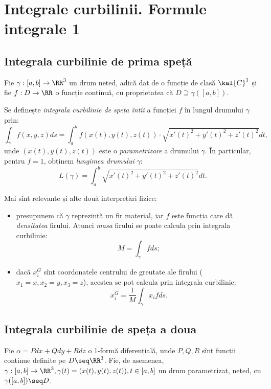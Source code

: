 \chapter{Integrale curbilinii. Formule integrale 1}

\section{Integrala curbilinie de prima speță}

Fie $ \gamma : [a, b] \to \RR^3 $ un drum neted, adică dat de o funcție
de clasă $ \kal{C}^1 $ și fie $ f : D \to \RR $ o funcție continuă, cu
proprietatea că $ D \supseteq \gamma([a, b]) $.

Se definește \emph{integrala curbilinie de speța întîi} a funcției $ f $
în lungul drumului $ \gamma $ prin:
\[
  \int_\gamma f(x, y, z) ds = \int_a^b f(x(t), y(t), z(t)) \cdot %
  \sqrt{x'(t)^2 + y'(t)^2 + z'(t)^2} dt,
\]
unde $ (x(t), y(t), z(t)) $ este o \emph{parametrizare} a drumului $ \gamma $.
În particular, pentru $ f = 1 $, obținem \emph{lungimea drumului} $ \gamma $:
\[
  L(\gamma) = \int_a^b  \sqrt{x'(t)^2 + y'(t)^2 + z'(t)^2} dt.
\]

Mai sînt relevante și alte două interpretări fizice:
\begin{itemize}
\item presupunem că $ \gamma $ reprezintă un fir material, iar $ f $ este
  funcția care dă \emph{densitatea} firului. Atunci \emph{masa} firului se
  poate calcula prin integrala curbilinie:
  \[
    M = \int_\gamma fds;
  \]
\item dacă $ x_i^G $ sînt coordonatele centrului de greutate ale firului
  ($ x_1 = x, x_2 = y, x_3 = z $), acestea se pot calcula prin integrala
  curbilinie:
  \[
    x_i^G = \frac{1}{M} \int_\gamma x_i f ds.
  \]
\end{itemize}


\section{Integrala curbilinie de speța a doua}
Fie $ \alpha = Pdx + Qdy + R dz $ o 1-formă diferențială, unde $ P, Q, R $
sînt funcții continue definite pe $ D \seq \RR^3 $. Fie, de asemenea,
$ \gamma : [a, b] \to \RR^3, \gamma(t) = (x(t), y(t), z(t)), t \in [a, b] $
un drum parametrizat, neted, cu $ \gamma([a, b]) \seq D $.

